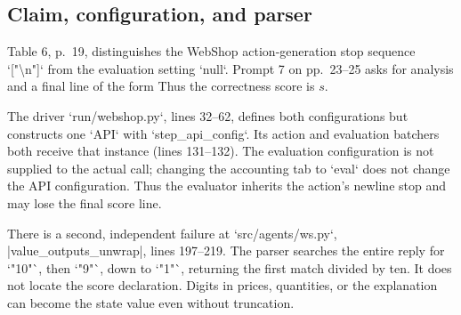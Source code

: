 \documentclass[10pt]{article}
\begin{document}
\subsection*{Claim, configuration, and parser}
Table 6, p. 19, distinguishes the WebShop action-generation stop sequence `["\textbackslash{}n"]` from the evaluation setting `null`. Prompt 7 on pp. 23–25 asks for analysis and a final line of the form Thus the correctness score is \(s\).\par
The driver `run/webshop.py`, lines 32–62, defines both configurations but constructs one `API` with `step\_api\_config`. Its action and evaluation batchers both receive that instance (lines 131–132). The evaluation configuration is not supplied to the actual call; changing the accounting tab to `eval` does not change the API configuration. Thus the evaluator inherits the action’s newline stop and may lose the final score line.\par
There is a second, independent failure at `src/agents/ws.py`, |value\_outputs\_unwrap|, lines 197–219. The parser searches the entire reply for `"10"`, then `"9"`, down to `"1"`, returning the first match divided by ten. It does not locate the score declaration. Digits in prices, quantities, or the explanation can become the state value even without truncation.\par
\end{document}
